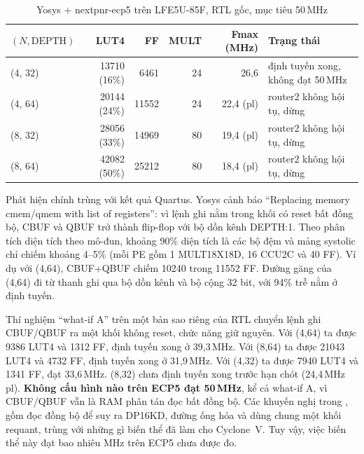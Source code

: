 \begin{table}[H]
  \centering
  \caption{Yosys + nextpnr-ecp5 trên LFE5U-85F, RTL gốc, mục tiêu 50\,MHz}
  \label{tab:yosys}
  \small
  \begin{tabular}{lrrrr>{\raggedright\arraybackslash}p{4.0cm}}
    \toprule
    $(N,\text{DEPTH})$ & LUT4 & FF & MULT & Fmax (MHz) & Trạng thái \\
    \midrule
    (4, 32) & \num{13710} (16\%) & \num{6461} & 24 & 26,6 & định tuyến xong, không đạt 50\,MHz \\
    (4, 64) & \num{20144} (24\%) & \num{11552} & 24 & 22,4 (pl) & router2 không hội tụ, dừng \\
    (8, 32) & \num{28056} (33\%) & \num{14969} & 80 & 19,4 (pl) & router2 không hội tụ, dừng \\
    (8, 64) & \num{42082} (50\%) & \num{25212} & 80 & 18,4 (pl) & router2 không hội tụ, dừng \\
    \bottomrule
  \end{tabular}
\end{table}

Phát hiện chính trùng với kết quả Quartus. Yosys cảnh báo ``Replacing memory cmem/qmem with list of registers'': vì lệnh ghi nằm trong khối  có reset bất đồng bộ, CBUF và QBUF trở thành flip-flop với bộ dồn kênh DEPTH:1. Theo phân tích diện tích theo mô-đun, khoảng 90\% diện tích là các bộ đệm và mảng systolic chỉ chiếm khoảng 4--5\% (mỗi PE gồm 1 MULT18X18D, 16 CCU2C và 40 FF). Ví dụ với (4,64), CBUF+QBUF chiếm \num{10240} trong \num{11552} FF. Đường găng của (4,64) đi từ thanh ghi  qua bộ dồn kênh  và bộ cộng 32 bit, với 94\% trễ nằm ở định tuyến.

Thí nghiệm ``what-if A'' trên một bản sao riêng của RTL chuyển lệnh ghi CBUF/QBUF ra một khối  không reset, chức năng giữ nguyên. Với (4,64) ta được \num{9386} LUT4 và \num{1312} FF, định tuyến xong ở 39,3\,MHz. Với (8,64) ta được \num{21043} LUT4 và \num{4732} FF, định tuyến xong ở 31,9\,MHz. Với (4,32) ta được \num{7940} LUT4 và \num{1341} FF, đạt 33,6\,MHz. (8,32) chưa định tuyến xong trước hạn chót (24,4\,MHz pl). \textbf{Không cấu hình nào trên ECP5 đạt 50\,MHz}, kể cả what-if A, vì CBUF/QBUF vẫn là RAM phân tán đọc bất đồng bộ. Các khuyến nghị trong , gồm đọc đồng bộ để suy ra DP16KD, đường ống hóa  và dùng chung một khối requant, trùng với những gì biến thể  đã làm cho Cyclone~V. Tuy vậy, việc biến thể này đạt bao nhiêu MHz trên ECP5 chưa được đo.

